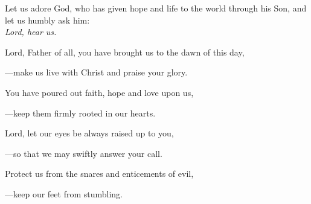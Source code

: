 \intercessions\indent

\begin{hangpar}

Let us adore God, who has given hope and life to the world through his Son, and let us humbly ask him:\\
\emph{Lord, hear us.}

\medskip Lord, Father of all, you have brought us to the dawn of this day,

{\color{red}---\thinspace}make us live with Christ and praise your glory.

\medskip You have poured out faith, hope and love upon us,

{\color{red}---\thinspace}keep them firmly rooted in our hearts.

\medskip Lord, let our eyes be always raised up to you,

{\color{red}---\thinspace}so that we may swiftly answer your call.

\medskip Protect us from the snares and enticements of evil,

{\color{red}---\thinspace}keep our feet from stumbling.

\end{hangpar}

